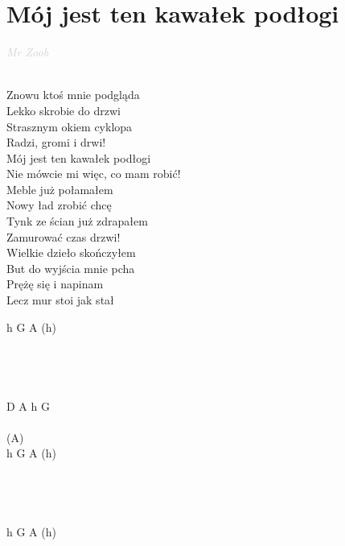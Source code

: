 \documentclass[a5paper, 10pt]{book}
\begin{document}
\newpage
\section{Mój jest ten kawałek podłogi}\textcolor{lightgray}{\textit{Mr Zoob}}\\~\\
\begin{minipage}[t]{0.6\textwidth}
  Znowu ktoś mnie podgląda\\
  Lekko skrobie do drzwi\\
  Strasznym okiem cyklopa\\
  Radzi, gromi i drwi!\\

  \hspace*{5mm}Mój jest ten kawałek podłogi\\
  \hspace*{5mm}Nie mówcie mi więc, co mam robić!\\

  Meble już połamałem\\
  Nowy ład zrobić chcę\\
  Tynk ze ścian już zdrapałem\\
  Zamurować czas drzwi!\\

  Wielkie dzieło skończyłem\\
  But do wyjścia mnie pcha\\
  Prężę się i napinam\\
  Lecz mur stoi jak stał\\

\end{minipage}
\begin{minipage}[t]{0.4\textwidth}
  h G A (h)\\
  \\
  \\
  \\
  \\
  D A h G\\
  \\
  (A)\\
  h G A (h)\\
  \\
  \\
  \\
  \\
  h G A (h)\\
  \\
  \\
  \\
  \\
\end{minipage}
\end{document}
